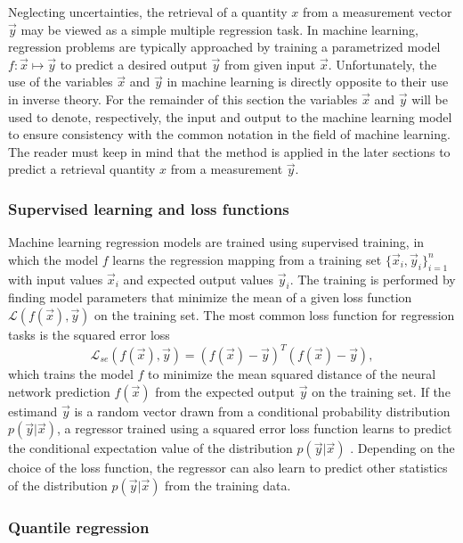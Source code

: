\documentclass[journal abbreviation, manuscript]{copernicus}
\begin{document}
Neglecting uncertainties, the retrieval of a quantity $x$ from a measurement
vector $\vec{y}$ may be viewed as a simple multiple regression task. In machine
learning, regression problems are typically approached by training a
parametrized model $f: \vec{x} \mapsto \vec{y}$ to predict a desired output
$\vec{y}$ from given input $\vec{x}$. Unfortunately, the use of the variables
$\vec{x}$ and $\vec{y}$ in machine learning is directly opposite to their use in
inverse theory. For the remainder of this section the variables $\vec{x}$ and
$\vec{y}$ will be used to denote, respectively, the input and output to the
machine learning model to ensure consistency with the common notation in the
field of machine learning. The reader must keep in mind that the method is
applied in the later sections to predict a retrieval quantity $x$ from a
measurement $\vec{y}$.

\subsubsection{Supervised learning and loss functions}

Machine learning regression models are trained using supervised training, in
which the model $f$ learns the regression mapping from a training set
$\{\vec{x}_i, \vec{y}_i\}_{i = 1}^n$ with input values $\vec{x}_i$ and expected
output values $\vec{y}_i$. The training is performed by finding model parameters
that minimize the mean of a given loss function $\mathcal{L}(f(\vec{x}),
\vec{y})$ on the training set. The most common loss function for regression
tasks is the squared error loss
\begin{equation}
  \mathcal{L}_{se}(f(\vec{x}), \vec{y}) = (f(\vec{x}) - \vec{y})^T (f(\vec{x}) - \vec{y}),
\end{equation}
which trains the model $f$ to minimize the mean squared distance
of the neural network prediction $f(\vec{x})$ from the expected output
$\vec{y}$ on the training set.
If the estimand $\vec{y}$ is a random vector drawn from a conditional
probability distribution $p(\vec{y} | \vec{x})$, a regressor trained using a
squared error loss function learns to predict the conditional expectation value of
the distribution $p(\vec{y} | \vec{x})$ \citep{bishop_mdn}. Depending on the
choice of the loss function, the regressor can also learn to predict other statistics of
the distribution $p(\vec{y} | \vec{x})$ from the training data.

\subsubsection{Quantile regression}
\end{document}
